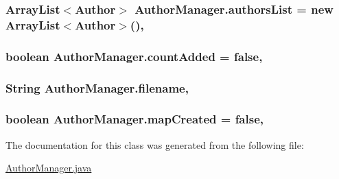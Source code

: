 \subsubsection[{\texorpdfstring{authors\+List}{authorsList}}]{\setlength{\rightskip}{0pt plus 5cm}Array\+List$<${\bf Author}$>$ Author\+Manager.\+authors\+List = new Array\+List$<${\bf Author}$>$()\hspace{0.3cm}{\ttfamily [static]}, {\ttfamily [private]}}\hypertarget{classAuthorManager_a16d40e3ce8111e6d3a8eccf786b1e6c8}{}\label{classAuthorManager_a16d40e3ce8111e6d3a8eccf786b1e6c8}
\subsubsection[{\texorpdfstring{count\+Added}{countAdded}}]{\setlength{\rightskip}{0pt plus 5cm}boolean Author\+Manager.\+count\+Added = false\hspace{0.3cm}{\ttfamily [static]}, {\ttfamily [private]}}\hypertarget{classAuthorManager_a5d91f1fb549ce31ad9cfcb2d6fc38817}{}\label{classAuthorManager_a5d91f1fb549ce31ad9cfcb2d6fc38817}
\subsubsection[{\texorpdfstring{filename}{filename}}]{\setlength{\rightskip}{0pt plus 5cm}String Author\+Manager.\+filename\hspace{0.3cm}{\ttfamily [static]}, {\ttfamily [private]}}\hypertarget{classAuthorManager_ab51e8e8b1326d63e88c21d56a9ea631a}{}\label{classAuthorManager_ab51e8e8b1326d63e88c21d56a9ea631a}
\subsubsection[{\texorpdfstring{map\+Created}{mapCreated}}]{\setlength{\rightskip}{0pt plus 5cm}boolean Author\+Manager.\+map\+Created = false\hspace{0.3cm}{\ttfamily [static]}, {\ttfamily [private]}}\hypertarget{classAuthorManager_a8007cf90e289ab4af6178566708969bc}{}\label{classAuthorManager_a8007cf90e289ab4af6178566708969bc}


The documentation for this class was generated from the following file\+:\begin{DoxyCompactItemize}
\item 
\hyperlink{AuthorManager_8java}{Author\+Manager.\+java}\end{DoxyCompactItemize}
